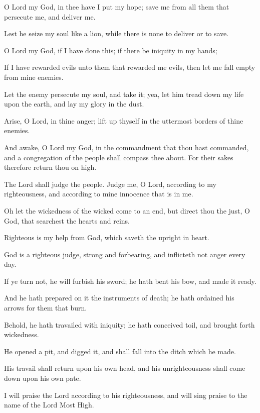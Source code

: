 O Lord my God, in thee have I put my hope; save me from all them that persecute me, and deliver me.

Lest he seize my soul like a lion, while there is none to deliver or to save.

O Lord my God, if I have done this; if there be iniquity in my hands;

If I have rewarded evils unto them that rewarded me evils, then let me fall empty from mine enemies.

Let the enemy persecute my soul, and take it; yea, let him tread down my life upon the earth, and lay my glory in the dust.

Arise, O Lord, in thine anger; lift up thyself in the uttermost borders of thine enemies.

And awake, O Lord my God, in the commandment that thou hast commanded, and a congregation of the people shall compass thee about. For their sakes therefore return thou on high.

The Lord shall judge the people. Judge me, O Lord, according to my righteousness, and according to mine innocence that is in me.

Oh let the wickedness of the wicked come to an end, but direct thou the just, O God, that searchest the hearts and reins.

Righteous is my help from God, which saveth the upright in heart.

God is a righteous judge, strong and forbearing, and inflicteth not anger every day.

If ye turn not, he will furbish his sword; he hath bent his bow, and made it ready.

And he hath prepared on it the instruments of death; he hath ordained his arrows for them that burn.

Behold, he hath travailed with iniquity; he hath conceived toil, and brought forth wickedness.

He opened a pit, and digged it, and shall fall into the ditch which he made.

His travail shall return upon his own head, and his unrighteousness shall come down upon his own pate.

I will praise the Lord according to his righteousness, and will sing praise to the name of the Lord Most High.
